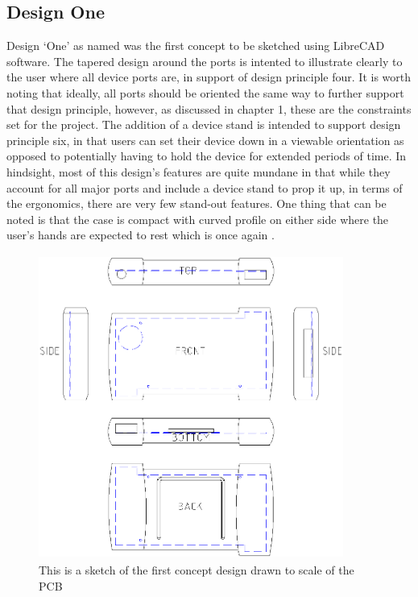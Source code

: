 \subsection{Design One}


Design ‘One’ as named was the first concept to be sketched using LibreCAD software.
The tapered design around the ports is intented to illustrate clearly to the user where all device ports are, in support of design principle four. 
It is worth noting that ideally, all ports should be oriented the same way to further support that design principle, however, as discussed in chapter 1, these are the constraints set for the project.
The addition of a device stand is intended to support design principle six, in that users can set their device down in a viewable orientation as opposed to potentially having to hold the device for extended periods of time.
In hindsight, most of this design’s features are quite mundane in that while they account for all major ports and include a device stand to prop it up, in terms of the ergonomics, there are very few stand-out features. 
One thing that can be noted is that the case is compact with curved profile on either side where the user’s hands are expected to rest which is once again .

\begin{figure}[hbt!]
\centering
\includegraphics[width=10cm,height=10cm,keepaspectratio]{Figures/design1_sketch.png}
\caption{This is a sketch of the first concept design drawn to scale of the PCB}
\label{fig:Design_1}
\end{figure}

